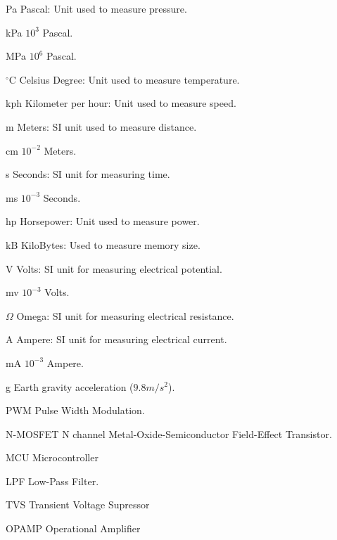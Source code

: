 \begin{simbolos}
	\item[Pa] Pascal: Unit used to measure pressure.
	\item[kPa] $10^3$ Pascal.
	\item[MPa] $10^6$ Pascal.
	\item[$^{\circ}$C] Celsius Degree: Unit used to measure temperature.
	\item[kph] Kilometer per hour: Unit used to measure speed.
	\item[m] Meters: SI unit used to measure distance.
	\item[cm] $10^{-2}$ Meters.
	\item[s] Seconds: SI unit for measuring time.
	\item[ms] $10^{-3}$ Seconds.
	\item[hp] Horsepower: Unit used to measure power.
	\item[kB] KiloBytes: Used to measure memory size.
	\item[V] Volts: SI unit for measuring electrical potential.
	\item[mv]  $10^{-3}$ Volts.
	\item[$\Omega$] Omega: SI unit for measuring electrical resistance.
	\item[A] Ampere: SI unit for measuring electrical current.
	\item[mA]  $10^{-3}$ Ampere.
	\item[g] Earth gravity acceleration ($9.8m/s^2$).
	\item[PWM] Pulse Width Modulation.
	\item[N-MOSFET] N channel Metal-Oxide-Semiconductor Field-Effect Transistor.
	\item[MCU] Microcontroller
	\item[LPF] Low-Pass Filter.
	\item[TVS] Transient Voltage Supressor
	\item[OPAMP] Operational Amplifier
\end{simbolos}
